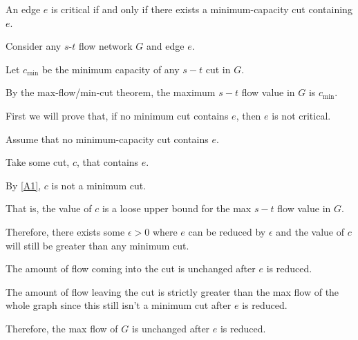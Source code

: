 \documentclass[10pt]{article}
\begin{document}



\begin{lemma}
  An edge $e$ is critical if and only if there exists a minimum-capacity cut containing $e$.
\end{lemma}

\begin{longFormProof}

  \begin{block}[A]
    {Consider any $s$-$t$ flow network $G$ and edge $e$.}

    \step Let $c_{\min}$ be the minimum capacity of any $s-t$ cut in $G$.

    \step By the max-flow/min-cut theorem, the maximum $s-t$ flow value in $G$ is $c_{\min}$. 

    \smallskip

    \lineacross
    
    \step First we will prove that, if no minimum cut contains $e$, then $e$ is not critical. 

    \begin{block}[A1]
      {Assume that no minimum-capacity cut contains $e$.}

      \begin{block}[A11]
        {Take some cut, $c$, that contains $e$.}

        \step By \ref{A1}, $c$ is not a minimum cut.

        \step That is, the value of $c$ is a loose upper bound for the max $s-t$ flow value in $G$.

        \step Therefore, there exists some $\epsilon > 0$ where $e$ can be reduced by $\epsilon$ and the value of
                $c$ will still be greater than any minimum cut.

        \step The amount of flow coming into the cut is unchanged after $e$ is reduced.

        \step The amount of flow leaving the cut is strictly greater than the max flow of 
                the whole graph since this still isn't a minimum cut after $e$ is reduced.

        \step Therefore, the max flow of $G$ is unchanged after $e$ is reduced.


\end{block}
\end{block}
\end{block}
\end{longFormProof}
\end{document}
